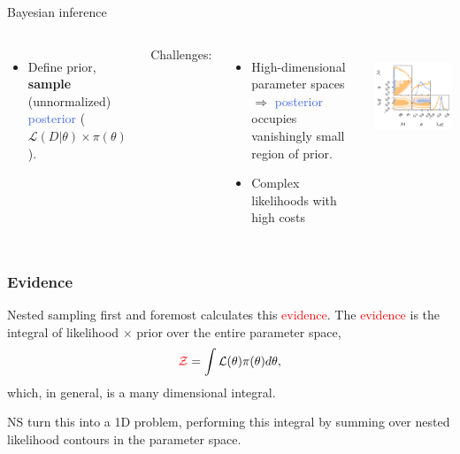 \documentclass[aspectratio=169, 11pt]{beamer}
\begin{document}
\begin{frame}{Bayesian inference}
\begin{columns}
    
\begin{itemize}
    \item Define \textcolor{BurntOrange}{prior}, \textbf{sample} (unnormalized) \textcolor{RoyalBlue}{posterior} ($\mathcal{L}(D | \theta) \times \pi(\theta)$).
\end{itemize}
\vspace{2em}
\raggedright
Challenges:\vfill
    \begin{itemize}
        \item High-dimensional parameter spaces $\Rightarrow$ \textcolor{RoyalBlue}{posterior} occupies vanishingly small region of \textcolor{BurntOrange}{prior}.
        \item Complex likelihoods with high costs
    \end{itemize}
    \vfill 

\
\vspace{-2em}
\centering
\includegraphics[]{Ca_Foscari Beamer/presentation_triangleplot.pdf}
\end{columns}
\end{frame}

\begin{frame}
\frametitle{Evidence}
Nested sampling first and foremost calculates this \textcolor{red}{evidence}. The \textcolor{red}{evidence} is the integral of likelihood $\times$ prior over the entire parameter space,
\begin{equation}
    \textcolor{red}{\mathcal{Z}} = \int \mathcal{L(\theta)} \pi(\theta) d\theta,
\end{equation}
which, in general, is a many dimensional integral.
\vfill

NS turn this into a 1D problem, performing this integral by summing over nested likelihood contours in the parameter space.
\end{frame}
\end{document}
